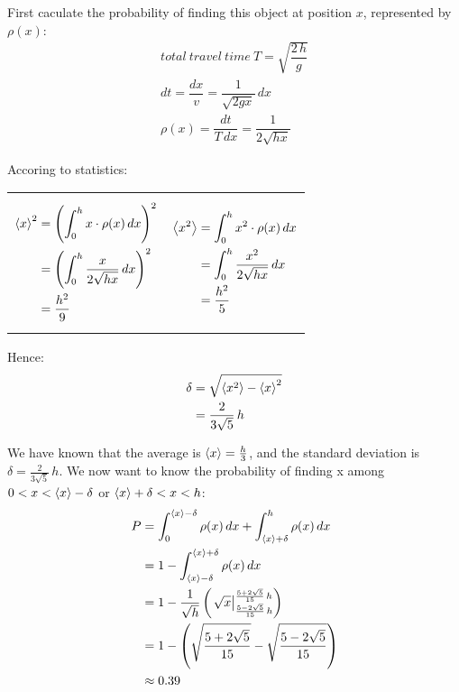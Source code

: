         {\color{hwSolution}
            First caculate the probability of finding this object at position $x$, represented by $\rho(x)$:
            \begin{align*}
                total~travel~time~T=\sqrt{\dfrac{2\,h}{g}}\\
                dt = \dfrac{dx}{v} = \dfrac{1}{\sqrt{2gx}}\,dx\\
                \rho(x) = \dfrac{dt}{T\,dx} = \dfrac{1}{2\sqrt{hx}}
            \end{align*}

            Accoring to statistics:

            \begin{tabularx}{\linewidth}{X|X}
                {\begin{align*}
                \left<x\right>^2   &= \left(\int_0^h x\cdot\rho(x)\,dx\right)^2\\
                &= \left(\int_0^h \dfrac{x}{2\sqrt{hx}}\,dx\right)^2\\
                &= \dfrac{h^2}{9}\\
                \end{align*}}
                &
                {\begin{align*}
                \left<x^2\right>   &= \int_0^h x^2\cdot\rho(x)\,dx\\
                &= \int_0^h \dfrac{x^2}{2\sqrt{hx}}\,dx\\
                &= \dfrac{h^2}{5}
                \end{align*}}
            \end{tabularx}

            Hence:
            \begin{align*}
                \delta  &= \sqrt{\left<x^2\right> - \left<x\right>^2}\\
                        &= \dfrac{2}{3\sqrt{5}}\,h
            \end{align*}
        }


        {\color{hwSolution}
            We have known that the average is $\left<x\right>=\frac{h}{3}$, and the standard deviation is $\delta=\frac{2}{3\sqrt{5}}\,h$. We now want to know the probability of finding x among $0<x<\left<x\right>-\delta$ or $\left<x\right>+\delta < x < h$:
            \begin{align*}
                P   &= \int_0^{\left<x\right>-\delta} \rho(x)\,dx + \int_{\left<x\right>+\delta}^h \rho(x)\,dx\\
                    &= 1 - \int_{\left<x\right>-\delta}^{\left<x\right>+\delta} \rho(x)\,dx\\
                    &= 1 - \dfrac{1}{\sqrt{h}}\left(
                        \left. \sqrt{x}\right|_{\frac{5-2\sqrt{5}}{15}\,h}^{\frac{5+2\sqrt{5}}{15}\,h}
                    \right)\\
                    &= 1 - \left(\sqrt{\dfrac{5+2\sqrt{5}}{15}}-\sqrt{\dfrac{5-2\sqrt{5}}{15}}\right)\\
                    &\approx 0.39
            \end{align*}
        }

